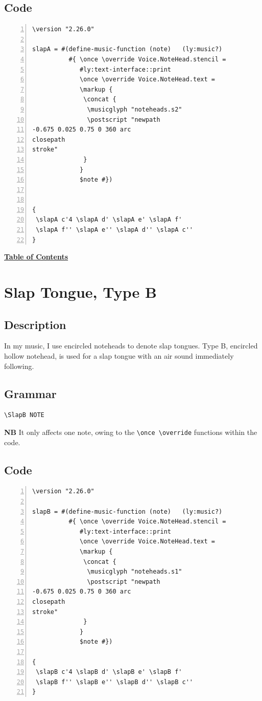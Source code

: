 \subsection{Code}
\begin{Verbatim}[numbers=left,xleftmargin=5mm]
\version "2.26.0"

slapA = #(define-music-function (note)   (ly:music?)
          #{ \once \override Voice.NoteHead.stencil =
             #ly:text-interface::print
             \once \override Voice.NoteHead.text =
             \markup {
              \concat {
               \musicglyph "noteheads.s2"
               \postscript "newpath
-0.675 0.025 0.75 0 360 arc 
closepath 
stroke"
              }
             }
             $note #})


{
 \slapA c'4 \slapA d' \slapA e' \slapA f'
 \slapA f'' \slapA e'' \slapA d'' \slapA c''
}
\end{Verbatim} 
\hyperref[sec:toc]{\textbf{Table of Contents}}

\vfill \break


\section {Slap Tongue, Type B}
\hfill
\subsection{Description}
In my music, I use encircled noteheads to denote slap tongues. Type B, encircled hollow notehead, is used for a slap tongue with an air sound immediately following.  

\subsection{Grammar}
\begin{verbatim}
\SlapB NOTE
\end{verbatim}
\textbf{NB} It only affects one note, owing to the \verb|\once \override| functions within the code.
\subsection{Code}
\begin{Verbatim}[numbers=left,xleftmargin=5mm]
\version "2.26.0"

slapB = #(define-music-function (note)   (ly:music?)
          #{ \once \override Voice.NoteHead.stencil =
             #ly:text-interface::print
             \once \override Voice.NoteHead.text =
             \markup {
              \concat {
               \musicglyph "noteheads.s1"
               \postscript "newpath 
-0.675 0.025 0.75 0 360 arc 
closepath
stroke"
              }
             }
             $note #})

{
 \slapB c'4 \slapB d' \slapB e' \slapB f'
 \slapB f'' \slapB e'' \slapB d'' \slapB c''
}

\end{Verbatim}
